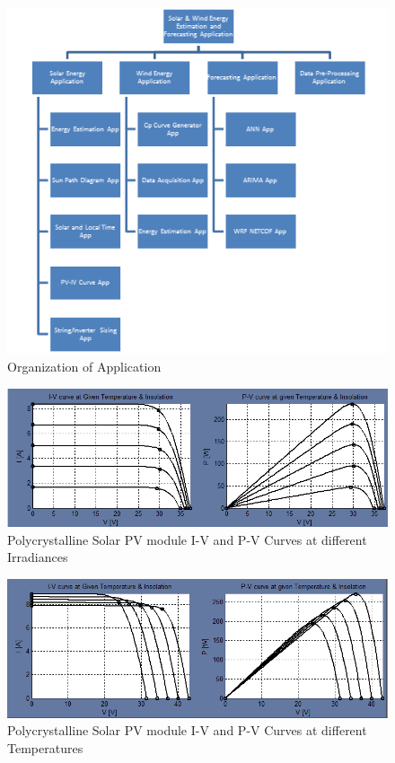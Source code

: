 \documentclass[12pt]{article}
\begin{document}
\begin{figure}[H]
\centering
\includegraphics[scale=1]{Intro3}
\caption{Organization of Application}
\label{figc1h1} %
\end{figure}


\begin{figure}[H]
\centering
\includegraphics[scale=0.5]{Poly_Irradiance}
\caption{Polycrystalline Solar PV module I-V and P-V Curves at different Irradiances}
\label{figc3h15} %
\end{figure}

\begin{figure}[H]
\centering
\includegraphics[scale=0.5]{Poly_Temperature}
\caption{Polycrystalline Solar PV module I-V and P-V Curves at different Temperatures}
\label{figc3h16} %
\end{figure}
\end{document}

